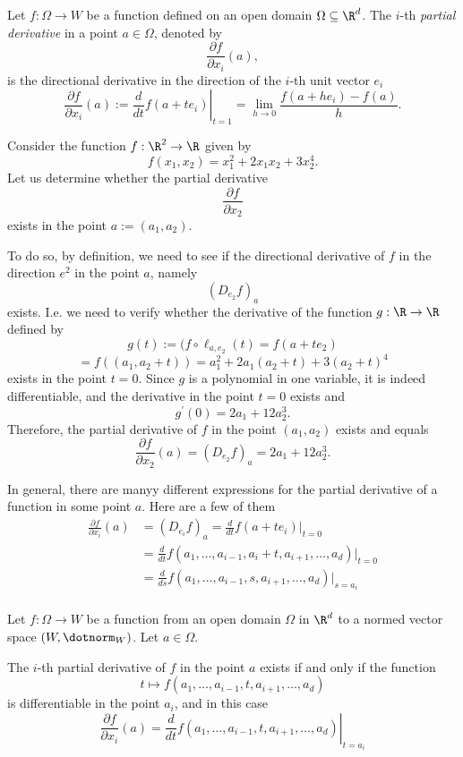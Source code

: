 \begin{definition}
    Let $f:\Omega\to W$ be a function defined on an open domain $\Omega \subseteq \R^d$.
    The $i$-th \emph{partial derivative} in a point $a \in \Omega$, denoted by
    $$\frac{\partial f}{\partial x_i}(a),$$
    is the directional derivative in the direction of the $i$-th unit vector $e_i$
    $$\frac{\partial f}{\partial x_i}(a) := \left.\frac{d}{dt}f(a+te_i)\right|_{t=1}=\lim_{h\to 0}\frac{f(a+he_i)-f(a)}{h}.$$
\end{definition}
\begin{example}
    Consider the function $f:\R^2\to\R$ given by
    $$f(x_1,x_2) = x_1^2+2x_1x_2+3x_2^4.$$
    Let us determine whether the partial derivative
    $$\frac{\partial f}{\partial x_2}$$
    exists in the point $a:=(a_1,a_2)$.

    To do so, by definition, we need to see if the directional derivative of $f$
    in the direction $e^2$ in the point $a$, namely
    $$(D_{e_2}f)_a$$
    exists.
    I.e. we need to verify whether the derivative of the function $g: \R \to \R$
    defined by
    $$g(t):=(f \circ \ell_{a,e_2}(t) = f(a+te_2)$$
    $$=f((a_1,a_2+t)) = a_1^2+2a_1(a_2+t)+3(a_2+t)^4$$
    exists in the point $t=0$. Since $g$ is a polynomial in one variable, it is indeed
    differentiable, and the derivative in the point $t=0$ exists and
    $$g^\prime(0) = 2a_1+12a_2^3.$$
    Therefore, the partial derivative of $f$ in the point $(a_1,a_2)$ exists and equals
    $$\frac{\partial f}{\partial x_2}(a) = (D_{e_2}f)_a=2a_1+12a_2^3.$$
\end{example}
In general, there are manyy different expressions for the partial derivative of a
function in some point $a$. Here are a few of them
\begin{align*}
    \frac{\partial f}{\partial x_i}(a) &= (D_{e_i}f)_a = \frac{d}{dt}f(a+te_i)\Bigr|_{t=0} \\
                                       &= \frac{d}{dt}f(a_1,\dots,a_{i-1},a_i+t,a_{i+1},\dots,a_d)\Bigr|_{t=0} \\
                                       &= \frac{d}{ds}f(a_1,\dots,a_{i-1},s,a_{i+1},\dots,a_d)\Bigr|_{s=a_i} \\
\end{align*}
\begin{proposition}
    Let $f:\Omega\to W$ be a function from an open domain $\Omega$ in $\R^d$ to a
    normed vector space $(W,\dotnorm_W)$. Let $a \in \Omega$.

    The $i$-th partial derivative of $f$ in the point $a$ exists if and only if the 
    function
    $$t \mapsto f(a_1,\dots,a_{i-1},t,a_{i+1},\dots,a_d)$$
    is differentiable in the point $a_i$, and in this case
    $$\frac{\partial f}{\partial x_i}(a) = \left.\frac{d}{dt}f(a_1,\dots,a_{i-1},t,a_{i+1},\dots,a_d)\right|_{t=a_i}$$
\end{proposition}
